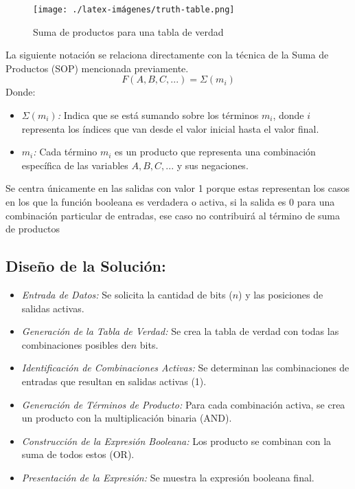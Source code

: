 \begin{figure}[h!]
    \centering
    \texttt{[image: ./latex-imágenes/truth-table.png]}
    \caption{Suma de productos para una tabla de verdad}
    \label{fig:enter-label}
\end{figure}
La siguiente notación se relaciona directamente con la técnica de la Suma de Productos (SOP) mencionada previamente.\\
\begin{equation}
    F(A, B, C, ...) = \Sigma(m_i)
    \label{eqn:SOPnotacionSigma}
\end{equation}
Donde:
\begin{itemize}

  \item[{\ieeeguilsinglright}] {\it \(\Sigma(m_i)\):} Indica que se está sumando sobre los términos \(m_i\), donde \(i\) representa los índices que van desde el valor inicial hasta el valor final.

  \item[{\ieeeguilsinglright}] {\it \(m_i\):} Cada término \(m_i\) es un producto que representa una combinación específica de las variables \(A, B, C, ...\) y sus negaciones.
\end{itemize}

Se centra únicamente en las salidas con valor 1 porque estas representan los casos en los que la función booleana es verdadera o activa, si la salida es 0 para una combinación particular de entradas, ese caso no contribuirá al término de suma de productos


\subsection{\textbf{Diseño de la Solución:}}

\begin{itemize}
    \item[{\ieeeguilsinglright}] {\it Entrada de Datos:}
        Se solicita la cantidad de bits (\(n\)) y las posiciones de salidas activas.
        
    \item[{\ieeeguilsinglright}] {\it Generación de la Tabla de Verdad:}
        Se crea la tabla de verdad con todas las combinaciones posibles de\(n\) bits.

    \item[{\ieeeguilsinglright}] {\it Identificación de Combinaciones Activas:}
        Se determinan las combinaciones de entradas que resultan en salidas activas (1).

    \item[{\ieeeguilsinglright}] {\it Generación de Términos de Producto:}
        Para cada combinación activa, se crea un producto con la multiplicación binaria (AND).

    \item[{\ieeeguilsinglright}] {\it Construcción de la Expresión Booleana:}
        Los producto se combinan con la suma de todos estos (OR).

    \item[{\ieeeguilsinglright}] {\it Presentación de la Expresión:}
         Se muestra la expresión booleana final.        
\end{itemize}

